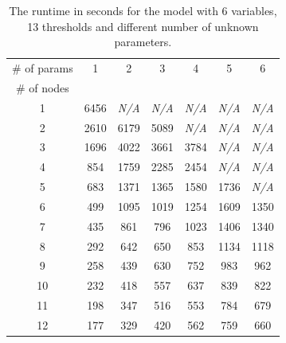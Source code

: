 \documentclass[12pt,oneside]{fithesis2}
\begin{document}
				\begin{table}
				\label{tab:param}
					\centering
					\setlength{\tabcolsep}{6pt}
					\begin{tabular}{|*{7}{c|}}
						\hline
							\# of params	& 1 	& 2 	& 3	& 4	& 5	& 6	\\
						\cline{1-1}
							\# of nodes	&	&	&	&	&	&	\\
						\hline
							1 & 6456	& {\em N/A} & {\em N/A} & {\em N/A} & {\em N/A} & {\em N/A} \\
							2	& 2610		& 6179			& 5089			& 	{\em N/A}				&	{\em N/A}					&	{\em N/A}					\\
							3	&	1696		&	4022			&	3661			&	3784			&	{\em N/A}					&	{\em N/A}					\\
							4	&	854			&	1759			&	2285			&	2454			&	{\em N/A}					&	{\em N/A}					\\
							5	&	683			&	1371			&	1365			&	1580			&	1736			&	{\em N/A}					\\
							6	&	499			&	1095			&	1019			&	1254			&	1609			&	1350			\\
							7	&	435			&	861				&	796				&	1023			&	1406			&	1340			\\
							8	&	292			&	642				&	650				&	853				&	1134			&	1118			\\
							9	&	258			&	439				&	630				&	752				&	983				&	962				\\
						 	10	&	232			&	418				&	557				& 637				&	839				&	822				\\
							11	&	198			&	347				&	516				&	553				&	784				&	679				\\
							12	&	177			&	329				&	420				&	562				&	759				&	660				\\
						\hline
					\end{tabular}\\[1em]
					\caption{The runtime in seconds for the model with 6 variables, 13 thresholds and different number of unknown parameters.}				
			\end{table}
\end{document}
